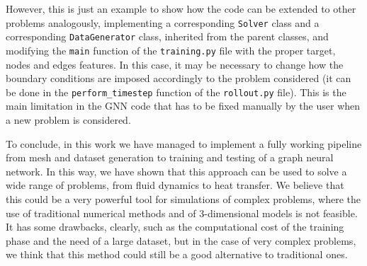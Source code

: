 \documentclass[11pt,a4paper]{article}
\begin{document}
However, this is just an example to show how the code can be extended to other problems analogously, implementing a corresponding \texttt{Solver} class and a corresponding \texttt{DataGenerator} class, inherited from the parent classes, and modifying the \texttt{main} function of the \texttt{training.py} file with the proper target, nodes and edges features. In this case, it may be necessary to change how the boundary conditions are imposed accordingly to the problem considered (it can be done in the \texttt{perform\_timestep} function of the \texttt{rollout.py} file). This is the main limitation in the GNN code that has to be fixed manually by the user when a new problem is considered. 

To conclude, in this work we have managed to implement a fully working pipeline from mesh and dataset generation to training and testing of a graph neural network. In this way, we have shown that this approach can be used to solve a wide range of problems, from fluid dynamics to heat transfer. We believe that this could be a very powerful tool for simulations of complex problems, where the use of traditional numerical methods and of 3-dimensional models is not feasible. It has some drawbacks, clearly, such as the computational cost of the training phase and the need of a large dataset, but in the case of very complex problems, we think that this method could still be a good alternative to traditional ones.


\newpage
\end{document}
